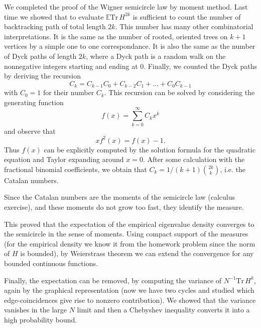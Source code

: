 \documentclass[a4paper]{article}
\begin{document}
We completed the proof of the Wigner semicircle law by moment method. Last time we showed that to evaluate $\mathbb E \text{Tr}\, H^{2k}$ is sufficient to count the number of backtracking path of total length $2k$. This number has many other combinatorial interpretations. It is the same as the number of rooted, oriented trees on $k+1$ vertices by a simple one to one correspondance. It is also the same as the number of Dyck paths of length $2k$, where a Dyck path is a random walk on the nonnegative integers starting and ending at $0$. Finally, we counted the Dyck paths by deriving the recursion
%
\begin{equation*}

C_k = C_{k-1} C_0 + C_{k-2} C_1 + \ldots  + C_0 C_{k-1}

\end{equation*}
with $C_0=1$ for their number $C_k$. This recursion can be solved by considering the generating
function
%
\begin{equation*}

f(x) = \sum_{k=0}^\infty C_k x^k

\end{equation*}
and observe that
%
\begin{equation*}

xf^2(x) = f(x) - 1.

\end{equation*}
Thus $f(x)$ can be explicitly computed by the solution formula for the quadratic equation and Taylor expanding around $x=0$. After some calculation with the fractional binomial coefficients, we obtain that $C_k = 1/(k+1) {2k \choose k}$, i.e. the Catalan numbers.

Since the Catalan numbers are the moments of the semicircle law (calculus exercise), and these moments do not grow too fast, they identify the measure.

This proved that the expectation of the empirical eigenvalue density converges to the semicircle in the sense of moments. Using compact support of the measures (for the empirical density we know it from the homework problem since the norm of $H$ is bounded), by Weierstrass theorem we can extend the
convergence for any bounded continuous functions.

Finally, the expectation can be removed, by computing the variance of
$N^{-1} \text{Tr}\, H^k$, again by the graphical representation (now we have two cycles and studied which edge-coincidences give rise to nonzero contribution). We showed that the variance vanishes in the large $N$ limit and then a Chebyshev inequality converts it into a high probability bound.
\end{document}
